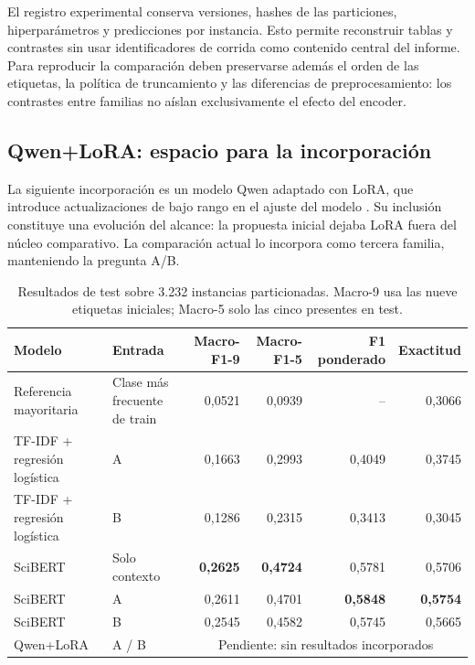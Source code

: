\documentclass[10pt,a4paper,twocolumn]{article}
\begin{document}
El registro experimental conserva versiones, hashes de las particiones, hiperparámetros y predicciones por instancia. Esto permite reconstruir tablas y contrastes sin usar identificadores de corrida como contenido central del informe. Para reproducir la comparación deben preservarse además el orden de las etiquetas, la política de truncamiento y las diferencias de preprocesamiento: los contrastes entre familias no aíslan exclusivamente el efecto del encoder.

\subsection{Qwen+LoRA: espacio para la incorporación}
La siguiente incorporación es un modelo Qwen adaptado con LoRA, que introduce actualizaciones de bajo rango en el ajuste del modelo \cite{lora}. Su inclusión constituye una evolución del alcance: la propuesta inicial dejaba LoRA fuera del núcleo comparativo. La comparación actual lo incorpora como tercera familia, manteniendo la pregunta A/B.

\noindent{}

\begin{table}[t]
\centering\small
\caption{Resultados de test sobre 3.232 instancias particionadas. Macro-9 usa las nueve etiquetas iniciales; Macro-5 solo las cinco presentes en test.}\label{tab:results}
\begin{tabular}{llrrrr}\toprule
Modelo & Entrada & Macro-F1-9 & Macro-F1-5 & F1 ponderado & Exactitud\\\midrule
Referencia mayoritaria & Clase más frecuente de train & 0,0521 & 0,0939 & -- & 0,3066\\
TF-IDF + regresión logística & A & 0,1663 & 0,2993 & 0,4049 & 0,3745\\
TF-IDF + regresión logística & B & 0,1286 & 0,2315 & 0,3413 & 0,3045\\\midrule
SciBERT & Solo contexto & \textbf{0,2625} & \textbf{0,4724} & 0,5781 & 0,5706\\
SciBERT & A & 0,2611 & 0,4701 & \textbf{0,5848} & \textbf{0,5754}\\
SciBERT & B & 0,2545 & 0,4582 & 0,5745 & 0,5665\\\midrule
Qwen+LoRA & A / B & \multicolumn{4}{c}{Pendiente: sin resultados incorporados}\\\bottomrule
\end{tabular}
\end{table}
\end{document}
